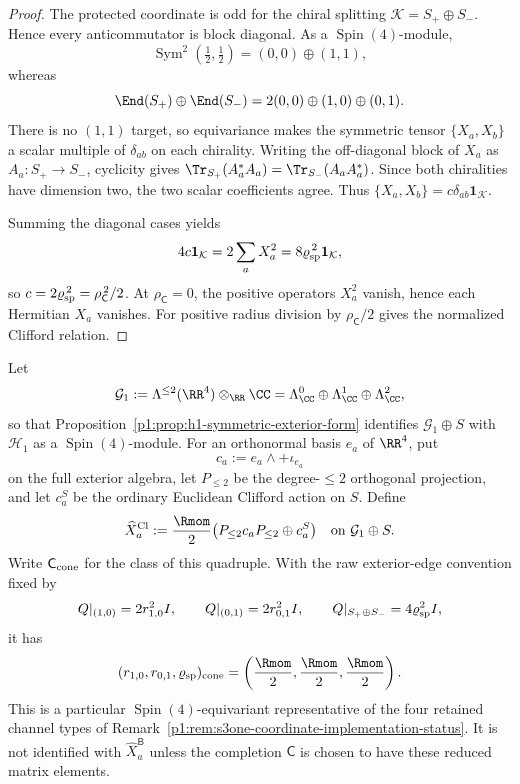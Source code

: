 \documentclass[11pt]{article}
\begin{document}
\begin{proof}
The protected coordinate is odd for the chiral splitting
\(\mathcal K=S_+\oplus S_-\).  Hence every anticommutator is block diagonal.
As a \(\operatorname{Spin}(4)\)-module,
\[
 \operatorname{Sym}^2(\tfrac12,\tfrac12)
 =(0,0)\oplus(1,1),
\]
whereas
\[
 \End(S_+)\oplus\End(S_-)
 =2(0,0)\oplus(1,0)\oplus(0,1).
\]
There is no \((1,1)\) target, so equivariance makes the symmetric tensor
\(\{X_a,X_b\}\) a scalar multiple of \(\delta_{ab}\) on each chirality.
Writing the off-diagonal block of \(X_a\) as \(A_a:S_+\to S_-\), cyclicity
gives
\(\Tr_{S_+}(A_a^*A_a)=\Tr_{S_-}(A_aA_a^*)\).  Since both chiralities have
dimension two, the two scalar coefficients agree.  Thus
\(\{X_a,X_b\}=c\delta_{ab}\mathbf1_{\mathcal K}\).

Summing the diagonal cases yields
\[
 4c\mathbf1_{\mathcal K}
 =2\sum_aX_a^2
 =8\varrho_{\rm sp}^{\,2}\mathbf1_{\mathcal K},
\]
so \(c=2\varrho_{\rm sp}^{\,2}=\rho_{\mathsf C}^{\,2}/2\).
At \(\rho_{\mathsf C}=0\), the positive operators \(X_a^2\) vanish, hence
each Hermitian \(X_a\) vanishes.  For positive radius division by
\(\rho_{\mathsf C}/2\) gives the normalized Clifford relation.
\end{proof}

\begin{definition}
\label{p1:def:clifford-coordinate-representative}
Let
\[
 \mathcal G_1:=\Lambda^{\le2}(\RR^4)\otimes_\RR\CC
 =\Lambda^0_\CC\oplus\Lambda^1_\CC\oplus\Lambda^2_\CC,
\]
so that Proposition~\ref{p1:prop:h1-symmetric-exterior-form} identifies
\(\mathcal G_1\oplus S\) with \(\mathcal H_1\) as a \(\operatorname{Spin}(4)\)-module.
For an orthonormal basis \(e_a\) of \(\RR^4\), put
\[
 c_a:=e_a\wedge+\iota_{e_a}
\]
on the full exterior algebra, let \(P_{\le2}\) be the degree-\(\le2\)
orthogonal projection, and let \(c_a^S\) be the ordinary Euclidean Clifford
action on \(S\).  Define
\[
 \widehat X_a^{\rm Cl}
 :=\frac{\Rmom}{2}
 \bigl(P_{\le2}c_aP_{\le2}\oplus c_a^S\bigr)
 \quad\text{on }\mathcal G_1\oplus S.
\]
Write \(\mathsf C_{\rm cone}\) for the class of this quadruple.  With the
raw exterior-edge convention fixed by
\[
 Q|_{(1,0)}=2r_{1,0}^2I,\qquad
 Q|_{(0,1)}=2r_{0,1}^2I,\qquad
 Q|_{S_+\oplus S_-}=4\varrho_{\rm sp}^2I,
\]
it has
\[
 (r_{1,0},r_{0,1},\varrho_{\rm sp})_{\rm cone}
 =\left(\frac{\Rmom}{2},\frac{\Rmom}{2},
               \frac{\Rmom}{2}\right).
\]
This is a particular \(\operatorname{Spin}(4)\)-equivariant representative of the four
retained channel types of
Remark~\ref{p1:rem:s3one-coordinate-implementation-status}.  It is not
identified with \(\widehat X_a^{\mathsf B}\) unless the completion
\(\mathsf C\) is chosen to have these reduced matrix elements.
\end{definition}
\end{document}
